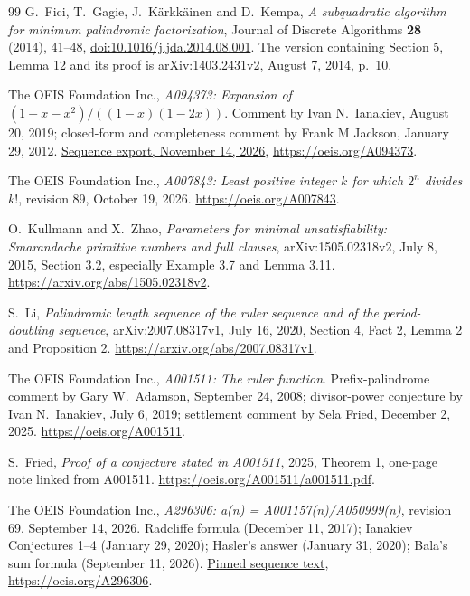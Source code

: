 \documentclass[11pt]{article}
\begin{document}
\begin{thebibliography}{99}
G.~Fici, T.~Gagie, J.~K\"arkk\"ainen and D.~Kempa,
\emph{A subquadratic algorithm for minimum palindromic factorization},
Journal of Discrete Algorithms \textbf{28} (2014), 41--48,
\href{https://doi.org/10.1016/j.jda.2014.08.001}{doi:10.1016/j.jda.2014.08.001}.
The version containing Section 5, Lemma 12 and its proof is
\href{https://arxiv.org/abs/1403.2431v2}{arXiv:1403.2431v2},
August 7, 2014, p.~10.

The OEIS Foundation Inc., \emph{A094373: Expansion of
$(1-x-x^2)/((1-x)(1-2x))$}.
Comment by Ivan N.\ Ianakiev, August 20, 2019; closed-form and
completeness comment by Frank M Jackson, January 29, 2012.
\href{https://github.com/oeis/oeisdata/blob/49db7744e1fdbefbe376d1d018370c017d4c288b/seq/A094/A094373.seq#L13}{Sequence export, November 14, 2026},
\url{https://oeis.org/A094373}.

The OEIS Foundation Inc., \emph{A007843: Least positive integer $k$
for which $2^n$ divides $k!$}, revision 89, October 19, 2026.
\url{https://oeis.org/A007843}.

O.~Kullmann and X.~Zhao, \emph{Parameters for minimal unsatisfiability:
Smarandache primitive numbers and full clauses},
arXiv:1505.02318v2, July 8, 2015, Section 3.2, especially
Example 3.7 and Lemma 3.11.
\url{https://arxiv.org/abs/1505.02318v2}.

S.~Li, \emph{Palindromic length sequence of the ruler sequence and of
the period-doubling sequence}, arXiv:2007.08317v1, July 16, 2020,
Section 4, Fact 2, Lemma 2 and Proposition 2.
\url{https://arxiv.org/abs/2007.08317v1}.

The OEIS Foundation Inc., \emph{A001511: The ruler function}.
Prefix-palindrome comment by Gary W.\ Adamson, September 24, 2008;
divisor-power conjecture by Ivan N.\ Ianakiev, July 6, 2019;
settlement comment by Sela Fried, December 2, 2025.
\url{https://oeis.org/A001511}.

S.~Fried, \emph{Proof of a conjecture stated in A001511}, 2025,
Theorem 1, one-page note linked from A001511.
\url{https://oeis.org/A001511/a001511.pdf}.

The OEIS Foundation Inc., \emph{A296306: a(n) = A001157(n)/A050999(n)},
revision 69, September 14, 2026. Radcliffe formula (December 11, 2017);
Ianakiev Conjectures 1--4 (January 29, 2020); Hasler's answer
(January 31, 2020); Bala's sum formula (September 11, 2026).
\href{https://github.com/oeis/oeisdata/blob/49db7744e1fdbefbe376d1d018370c017d4c288b/seq/A296/A296306.seq#L7}{Pinned sequence text},
\url{https://oeis.org/A296306}.


\end{thebibliography}
\end{document}
